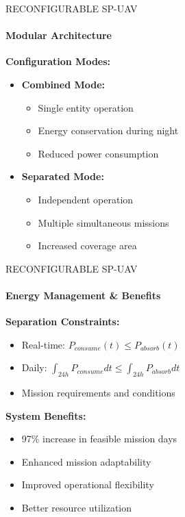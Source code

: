 \documentclass{beamer}
\begin{document}
\begin{frame}{RECONFIGURABLE SP-UAV}
    \framesubtitle{Modular Architecture}
    
    \textbf{Configuration Modes:}
    \begin{itemize}
        \item \textbf{Combined Mode:}
        \begin{itemize}
            \item Single entity operation
            \item Energy conservation during night
            \item Reduced power consumption
        \end{itemize}
        \item \textbf{Separated Mode:}
        \begin{itemize}
            \item Independent operation
            \item Multiple simultaneous missions
            \item Increased coverage area
        \end{itemize}
    \end{itemize}
\end{frame}

\begin{frame}{RECONFIGURABLE SP-UAV}
    \framesubtitle{Energy Management \& Benefits}
    
    \textbf{Separation Constraints:}
    \begin{itemize}
        \item Real-time: $P_{consume}(t) \leq P_{absorb}(t)$
        \item Daily: $\int_{24h} P_{consume}dt \leq \int_{24h} P_{absorb}dt$
        \item Mission requirements and conditions
    \end{itemize}
    
    \vspace{0.3cm}
    \textbf{System Benefits:}
    \begin{itemize}
        \item 97\% increase in feasible mission days
        \item Enhanced mission adaptability
        \item Improved operational flexibility
        \item Better resource utilization
    \end{itemize}
\end{frame}
\end{document}
